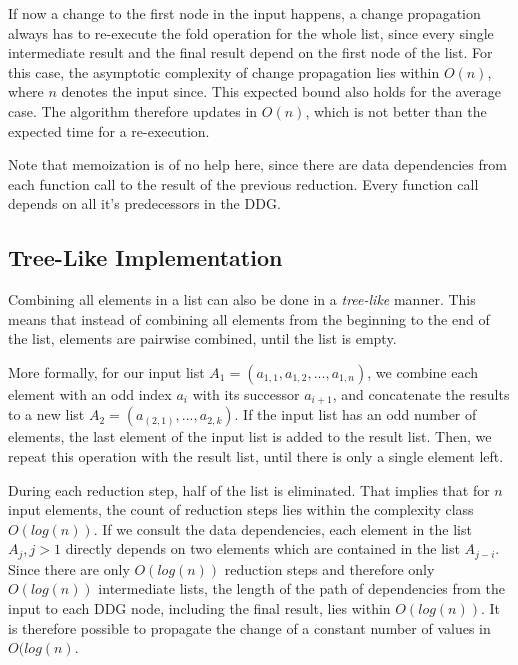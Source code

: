 If now a change to the first node in the input happens, a change propagation always has to re-execute the fold operation for the whole list, since every single intermediate result and the final result depend on the first node of the list. For this case, the asymptotic complexity of change propagation lies within $O(n)$, where $n$ denotes the input since. This expected bound also holds for the average case. The algorithm therefore updates in $O(n)$, which is not better than the expected time for a re-execution. 

Note that memoization is of no help here, since there are data dependencies from each function call to the result of the previous reduction. Every function call depends on all it's predecessors in the DDG.

\subsection{Tree-Like Implementation}

Combining all elements in a list can also be done in a \textit{tree-like} manner. This means that instead of combining all elements from the beginning to the end of the list, elements are pairwise combined, until the list is empty. 

More formally, for our input list $A_1 = (a_{1, 1}, a_{1, 2}, ..., a_{1, n})$, we combine each element with an odd index $a_i$ with its successor $a_{i + 1}$, and concatenate the results to a new list $A_2 = (a_{(2, 1)}, ..., a_{2, k})$. If the input list has an odd number of elements, the last element of the input list is added to the result list. Then, we repeat this operation with the result list, until there is only a single element left.

During each reduction step, half of the list is eliminated. That implies that for $n$ input elements, the count of reduction steps lies within the complexity class $O(log(n))$. If we consult the data dependencies, each element in the list $A_j, j > 1$ directly depends on two elements which are contained in the list $A_{j - i}$. Since there are only $O(log(n))$ reduction steps and therefore only $O(log(n))$ intermediate lists, the length of the path of dependencies from the input to each DDG node, including the final result, lies within $O(log(n))$. It is therefore possible to propagate the change of a constant number of values in $O(log(n)$. 

